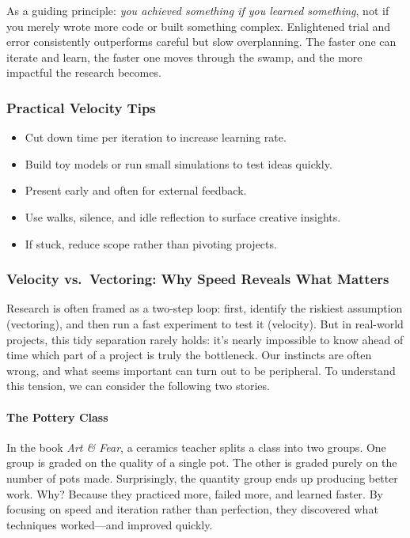 As a guiding principle: \textit{you achieved something if you learned something}, not if you merely wrote more code or built something complex.
Enlightened trial and error consistently outperforms careful but slow overplanning.
The faster one can iterate and learn, the faster one moves through the swamp, and the more impactful the research becomes.


\subsubsection*{Practical Velocity Tips}
\begin{itemize}
    \item Cut down time per iteration to increase learning rate.
    \item Build toy models or run small simulations to test ideas quickly.
    \item Present early and often for external feedback.
    \item Use walks, silence, and idle reflection to surface creative insights.
    \item If stuck, reduce scope rather than pivoting projects.
\end{itemize}

\subsubsection*{Velocity vs.\ Vectoring: Why Speed Reveals What Matters}

Research is often framed as a two-step loop: first, identify the riskiest assumption (vectoring), and then run a fast experiment to test it (velocity).
But in real-world projects, this tidy separation rarely holds: it's nearly impossible to know ahead of time which part of a project is truly the bottleneck.
Our instincts are often wrong, and what seems important can turn out to be peripheral.
To understand this tension, we can consider the following two stories.

\paragraph{The Pottery Class}
In the book \textit{Art \& Fear}, a ceramics teacher splits a class into two groups.
One group is graded on the quality of a single pot.
The other is graded purely on the number of pots made.
Surprisingly, the quantity group ends up producing better work.
Why? Because they practiced more, failed more, and learned faster.
By focusing on speed and iteration rather than perfection, they discovered what techniques worked---and improved quickly.

